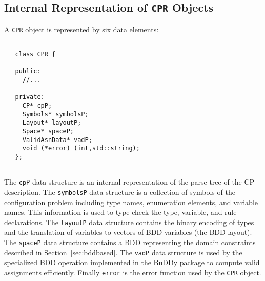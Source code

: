 \documentclass{article}
\begin{document}
\subsection{Internal Representation of \texttt{CPR} Objects}

A \texttt{CPR} object is represented by six data elements:
\begin{verbatim}

   class CPR {
   
   public:
     //...
    
   private:
     CP* cpP;
     Symbols* symbolsP;
     Layout* layoutP;
     Space* spaceP;
     ValidAsnData* vadP;
     void (*error) (int,std::string);
   };
   
\end{verbatim} 
The \texttt{cpP} data structure is an internal representation of the
parse tree of the CP description. The \texttt{symbolsP} data structure is a
collection of symbols of the configuration problem including type
names, enumeration elements, and variable names. This information is
used to type check the type, variable, and rule declarations. The
\texttt{layoutP} data structure contains the binary encoding of types 
and the translation of variables to vectors of BDD variables (the BDD
layout).  The \texttt{spaceP} data structure contains a BDD
representing the domain constraints described in
Section~\ref{sec:bddbased}. The \texttt{vadP} data structure is used
by the specialized BDD operation implemented in the BuDDy package to
compute valid assignments efficiently. Finally \texttt{error} is the 
error function used by the \texttt{CPR} object.
\end{document}
